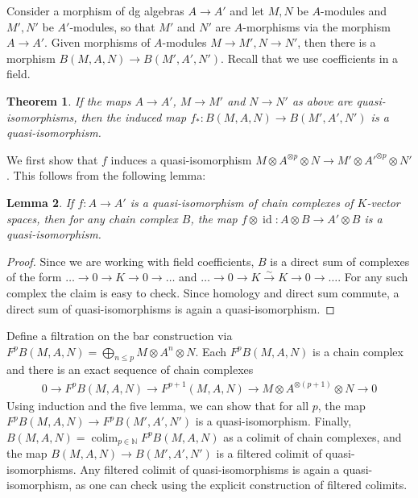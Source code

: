 \documentclass{scrartcl}
\theoremstyle{plain}
\newtheorem{theorem}{Theorem}[section]
\newtheorem{lemma}[theorem]{Lemma}
\theoremstyle{definition}
\newcommand{\N}{\mathbb N}
\let\xto\xrightarrow
\DeclareMathOperator{\id}{id}
\DeclareMathOperator{\colim}{colim}
\begin{document}


Consider a morphism of dg algebras $A\to A'$ and let $M, N$ be $A$-modules and $M', N'$ be $A'$-modules, so that $M'$ and $N'$ are $A$-morphisms via the morphism $A\to A'$. Given morphisms of $A$-modules $M\to M', N\to N'$, then there is a morphism $B(M, A, N)\to B(M', A', N')$. Recall that we use coefficients in a field.
\begin{theorem} \label{thm:bar-quiso}
    If the maps $A\to A'$, $M\to M'$ and $N\to N'$ as above are quasi-isomorphisms, then the induced map $f_*\colon B(M, A, N)\to B(M', A', N')$ is a quasi-isomorphism.
\end{theorem}
We first show that $f$ induces a quasi-isomorphism $M\otimes A^{\otimes p}\otimes N \to M'\otimes A'^{\otimes p}\otimes N'$. This follows from the following lemma: 
\begin{lemma} If $f\colon A\to A'$ is a quasi-isomorphism of chain complexes of $K$-vector spaces, then for any chain complex $B$, the map $f\otimes \id\colon A\otimes B\to A'\otimes B$ is a quasi-isomorphism. 
\end{lemma}
\begin{proof}
    Since we are working with field coefficients, $B$ is a direct sum of complexes of the form $\dots\to0\to K\to 0\to\dots$ and $\dots\to 0\to K\xto{\sim} K\to 0\to\dots$. For any such complex the claim is easy to check. Since homology and direct sum commute, a direct sum of quasi-isomorphisms is again a quasi-isomorphism.
\end{proof}
Define a filtration on the bar construction via $F^pB(M, A, N) = \bigoplus_{n\leq p} M\otimes A^n\otimes N$. Each $F^pB(M, A, N)$ is a chain complex and there is an exact sequence of chain complexes
\begin{align*}
    0\to F^pB(M, A, N)\to F^{p+1}(M, A, N) \to M\otimes A^{\otimes(p+1)}\otimes N \to 0
\end{align*}
Using induction and the five lemma, we can show that for all $p$, the map $F^pB(M, A, N)\to F^pB(M', A', N')$ is a quasi-isomorphism. Finally, $B(M, A, N)=\colim_{p\in \N} F^pB(M, A, N)$ as a colimit of chain complexes, and the map $B(M, A, N)\to B(M', A', N')$ is a filtered colimit of quasi-isomorphisms. Any filtered colimit of quasi-isomorphisms is again a quasi-isomorphism, as one can check using the explicit construction of filtered colimits. 
\end{document}
